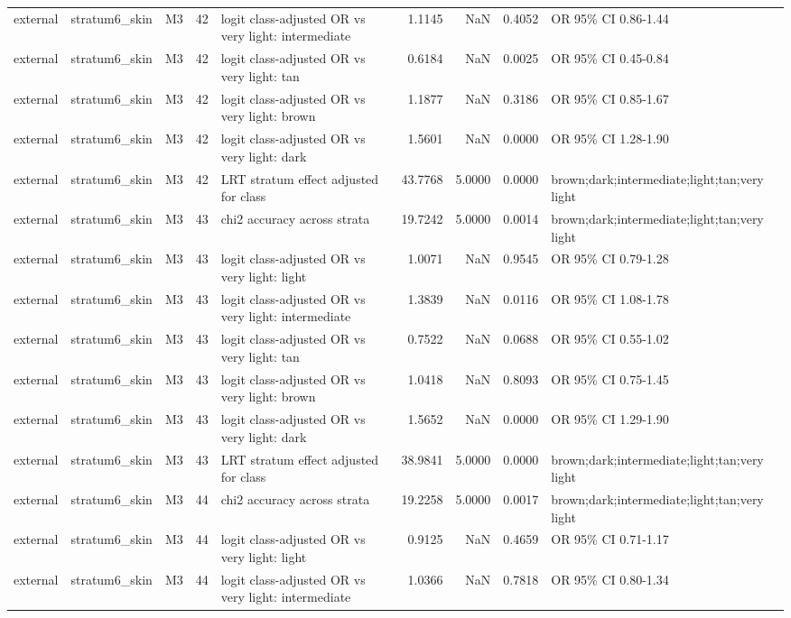 \begin{tabular}{lllrlrrrl}
external & stratum6\_skin & M3 & 42 & logit class-adjusted OR vs very light: intermediate & 1.1145 & NaN & 0.4052 & OR 95\% CI 0.86-1.44 \\
external & stratum6\_skin & M3 & 42 & logit class-adjusted OR vs very light: tan & 0.6184 & NaN & 0.0025 & OR 95\% CI 0.45-0.84 \\
external & stratum6\_skin & M3 & 42 & logit class-adjusted OR vs very light: brown & 1.1877 & NaN & 0.3186 & OR 95\% CI 0.85-1.67 \\
external & stratum6\_skin & M3 & 42 & logit class-adjusted OR vs very light: dark & 1.5601 & NaN & 0.0000 & OR 95\% CI 1.28-1.90 \\
external & stratum6\_skin & M3 & 42 & LRT stratum effect adjusted for class & 43.7768 & 5.0000 & 0.0000 & brown;dark;intermediate;light;tan;very light \\
external & stratum6\_skin & M3 & 43 & chi2 accuracy across strata & 19.7242 & 5.0000 & 0.0014 & brown;dark;intermediate;light;tan;very light \\
external & stratum6\_skin & M3 & 43 & logit class-adjusted OR vs very light: light & 1.0071 & NaN & 0.9545 & OR 95\% CI 0.79-1.28 \\
external & stratum6\_skin & M3 & 43 & logit class-adjusted OR vs very light: intermediate & 1.3839 & NaN & 0.0116 & OR 95\% CI 1.08-1.78 \\
external & stratum6\_skin & M3 & 43 & logit class-adjusted OR vs very light: tan & 0.7522 & NaN & 0.0688 & OR 95\% CI 0.55-1.02 \\
external & stratum6\_skin & M3 & 43 & logit class-adjusted OR vs very light: brown & 1.0418 & NaN & 0.8093 & OR 95\% CI 0.75-1.45 \\
external & stratum6\_skin & M3 & 43 & logit class-adjusted OR vs very light: dark & 1.5652 & NaN & 0.0000 & OR 95\% CI 1.29-1.90 \\
external & stratum6\_skin & M3 & 43 & LRT stratum effect adjusted for class & 38.9841 & 5.0000 & 0.0000 & brown;dark;intermediate;light;tan;very light \\
external & stratum6\_skin & M3 & 44 & chi2 accuracy across strata & 19.2258 & 5.0000 & 0.0017 & brown;dark;intermediate;light;tan;very light \\
external & stratum6\_skin & M3 & 44 & logit class-adjusted OR vs very light: light & 0.9125 & NaN & 0.4659 & OR 95\% CI 0.71-1.17 \\
external & stratum6\_skin & M3 & 44 & logit class-adjusted OR vs very light: intermediate & 1.0366 & NaN & 0.7818 & OR 95\% CI 0.80-1.34 \\

\end{tabular}

